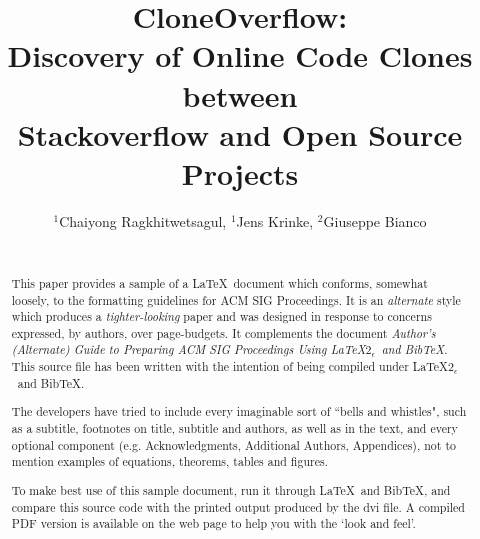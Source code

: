 \documentclass{sig-alternate-05-2015}
\begin{document}






%

\title{CloneOverflow: \\ Discovery of Online Code Clones between \\Stackoverflow and Open Source Projects}

\author{
	\alignauthor
	$^1$Chaiyong Ragkhitwetsagul, $^1$Jens Krinke, $^2$Giuseppe Bianco \\
	\\
}


\maketitle
\begin{abstract}
This paper provides a sample of a \LaTeX\ document which conforms,
somewhat loosely, to the formatting guidelines for
ACM SIG Proceedings. It is an {\em alternate} style which produces
a {\em tighter-looking} paper and was designed in response to
concerns expressed, by authors, over page-budgets.
It complements the document \textit{Author's (Alternate) Guide to
Preparing ACM SIG Proceedings Using \LaTeX$2_\epsilon$\ and Bib\TeX}.
This source file has been written with the intention of being
compiled under \LaTeX$2_\epsilon$\ and BibTeX.

The developers have tried to include every imaginable sort
of ``bells and whistles", such as a subtitle, footnotes on
title, subtitle and authors, as well as in the text, and
every optional component (e.g. Acknowledgments, Additional
Authors, Appendices), not to mention examples of
equations, theorems, tables and figures.

To make best use of this sample document, run it through \LaTeX\
and BibTeX, and compare this source code with the printed
output produced by the dvi file. A compiled PDF version
is available on the web page to help you with the
`look and feel'.
\end{abstract}
\end{document}
